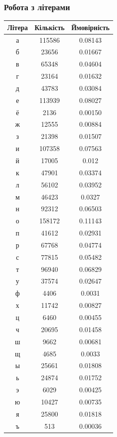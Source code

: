 \documentclass[12pt]{article}
\begin{document}
\subsubsection{Робота з літерами}
\begin{table}[htbp]
\centering
\begin{tabular}{|c|c|c|}
\hline
Літера & Кількість & Ймовірність \\ \hline
а & 115586 & 0.08143 \\
б & 23656 & 0.01667 \\
в & 65348 & 0.04604 \\
г & 23164 & 0.01632 \\
д & 43783 & 0.03084 \\
е & 113939 & 0.08027 \\
ё & 2136 & 0.00150 \\
ж & 12555 & 0.00884 \\
з & 21398 & 0.01507 \\
и & 107358 & 0.07563 \\
й & 17005 & 0.012 \\
к & 47901 & 0.03374 \\
л & 56102 & 0.03952 \\
м & 46423 & 0.0327 \\
н & 92312 & 0.06503 \\
о & 158172 & 0.11143 \\
п & 41612 & 0.02931 \\
р & 67768 & 0.04774 \\
с & 77815 & 0.05482 \\
т & 96940 & 0.06829 \\
у & 37574 & 0.02647 \\
ф & 4406 & 0.0031 \\
х & 11742 & 0.00827 \\
ц & 6460 & 0.00455 \\
ч & 20695 & 0.01458 \\
ш & 9662 & 0.00681 \\
щ & 4685 & 0.0033 \\
ы & 25661 & 0.01808 \\
ь & 24874 & 0.01752 \\
э & 6029 & 0.00425 \\
ю & 10427 & 0.00735 \\
я & 25800 & 0.01818 \\
ъ & 513 & 0.00036 \\ \hline
\end{tabular}
\label{tab:letter-results}
\end{table}
\end{document}
